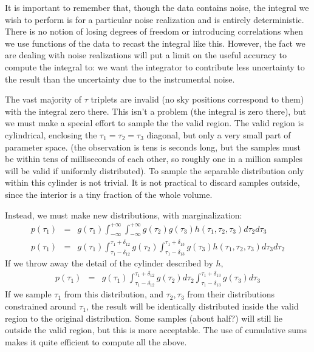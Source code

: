 \documentclass{article}
\begin{document}
It is important to remember that, though the data contains noise, the integral we wish to perform is for a particular noise realization and is entirely deterministic.  There is no notion of losing degrees of freedom or introducing correlations when we use functions of the data to recast the integral like this.  However, the fact we are dealing with noise realizations will put a limit on the useful accuracy to compute the integral to: we want the integrator to contribute less uncertainty to the result than the uncertainty due to the instrumental noise.

The vast majority of $\tau$ triplets are invalid (no sky positions correspond to them) with the integral zero there.  This isn't a problem (the integral is zero there), but we must make a special effort to sample the the valid region.
The valid region is cylindrical, enclosing the $\tau_1=\tau_2=\tau_3$ diagonal, but only a very small part of parameter space.  (the observation is tens is seconds long, but the samples must be within tens of milliseconds of each other, so roughly one in a million samples will be valid if uniformly distributed). To sample the separable distribution only within this cylinder is not trivial.  It is not practical to discard samples outside, since the interior is a tiny fraction of the whole volume.

Instead, we must make new distributions, with marginalization:
\begin{eqnarray}
p(\tau_1)&=&g(\tau_1)\int_{-\infty}^{+\infty}\int_{-\infty}^{+\infty} g(\tau_2) g(\tau_3) h(\tau_1,\tau_2,\tau_3) d\tau_2 d\tau_3\\
p(\tau_1)&=&g(\tau_1)\int_{\tau_1-\delta_{12}}^{\tau_1+\delta_{12}}g(\tau_2)\int_{\tau_1-\delta_{13}}^{\tau_1+\delta_{13}}g(\tau_3)h(\tau_1,\tau_2,\tau_3)d\tau_3d\tau_2
\end{eqnarray}
If we throw away the detail of the cylinder described by $h$,
\begin{eqnarray}
p(\tau_1)&=&g(\tau_1)\int_{\tau_1-\delta_{12}}^{\tau_1+\delta_{12}}g(\tau_2)d\tau_2\int_{\tau_1-\delta_{13}}^{\tau_1+\delta_{13}}g(\tau_3)d\tau_3
\end{eqnarray}
If we sample $\tau_1$ from this distribution, and $\tau_2, \tau_3$ from their distributions constrained around $\tau_1$, the result will be identically distributed inside the valid region to the original distribution.  Some samples (about half?) will still lie outside the valid region, but this is more acceptable.  The use of cumulative sums makes it quite efficient to compute all the above.
\end{document}
